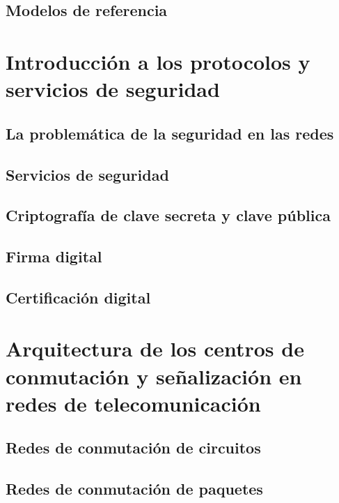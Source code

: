 \documentclass[a4paper]{book}
\begin{document}
\section{Modelos de referencia} \label{sec:modelos_de_referencia}





\chapter{Introducción a los protocolos y servicios de seguridad}


\section{La problemática de la seguridad en las redes}

\section{Servicios de seguridad}

\section{Criptografía de clave secreta y clave pública}

\section{Firma digital}

\section{Certificación digital}




\chapter{Arquitectura de los centros de conmutación y señalización en redes de telecomunicación}


\section{Redes de conmutación de circuitos}

\section{Redes de conmutación de paquetes}
\end{document}
